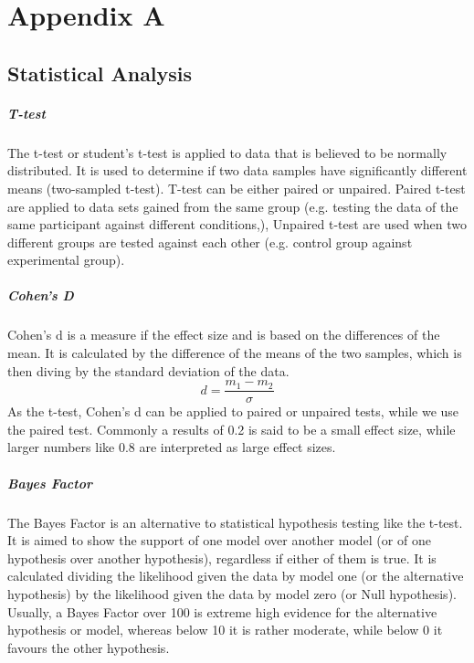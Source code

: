 \chapter*{Appendix A}
\section*{Statistical Analysis}
\paragraph{T-test}
The t-test or student's t-test is applied to data that is believed to be normally distributed. It is used to determine if two data samples have significantly different means (two-sampled t-test). T-test can be either paired or unpaired. Paired t-test are applied to data sets gained from the same group (e.g. testing the data of the same participant against different conditions,), Unpaired t-test are used when two different groups are tested against each other (e.g. control group against experimental group). 
\paragraph{Cohen's D}
Cohen's d is a measure if the effect size and is based on the differences of the mean. It is calculated by the difference of the means of the two samples, which is then diving by the standard deviation of the data. 
\begin{equation}
    d = \frac{m_1 - m_2}{\sigma}
\end{equation}
As the t-test, Cohen's d can be applied to paired or unpaired tests, while we use the paired test. 
Commonly a results of 0.2 is said to be a small effect size, while larger numbers like 0.8 are interpreted as large effect sizes. 
\paragraph{Bayes Factor}
The Bayes Factor is an alternative to statistical hypothesis testing like the t-test. It is aimed to show the support of one model over another model (or of one hypothesis over another hypothesis), regardless if either of them is true. 
It is calculated dividing the likelihood given the data by model one (or the alternative hypothesis) by the likelihood given the data by model zero (or Null hypothesis). 
Usually, a Bayes Factor over 100 is extreme high evidence for the alternative hypothesis or model, whereas below 10 it is rather moderate, while below 0 it favours the other hypothesis. 
